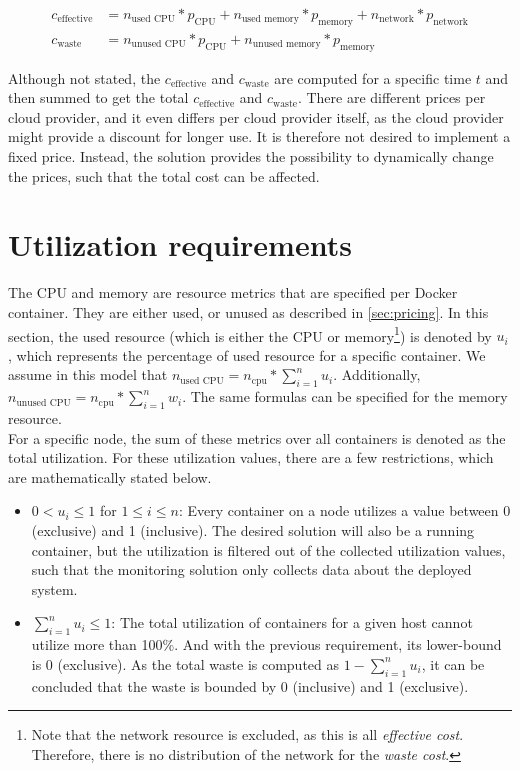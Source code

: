 \begin{equation} \label{eq:cost_and_waste}
\begin{split}
c_\text{effective} &=  n_\text{used CPU} * p_\text{CPU} + n_\text{used memory} * p_\text{memory} + n_\text{network} * p_\text{network} \\
c_\text{waste} &=  n_\text{unused CPU} * p_\text{CPU} + n_\text{unused memory} * p_\text{memory}
\end{split}
\end{equation}

\noindent 
Although not stated, the $c_\text{effective}$ and $c_\text{waste}$ are computed for a specific time $t$ and then summed to get the total $c_\text{effective}$ and $c_\text{waste}$. There are different prices per cloud provider, and it even differs per cloud provider itself, as the cloud provider might provide a discount for longer use. It is therefore not desired to implement a fixed price. Instead, the solution provides the possibility to dynamically change the prices, such that the total cost can be affected.

\section{Utilization requirements} \label{sec:util_req}
The CPU and memory are resource metrics that are specified per Docker container. They are either used, or unused as described in \autoref{sec:pricing}. In this section, the used resource (which is either the CPU or memory\footnote{Note that the network resource is excluded, as this is all \textit{effective cost}. Therefore, there is no distribution of the network for the \textit{waste cost}.}) is denoted by $u_i$, which represents the percentage of used resource for a specific container. We assume in this model that $n_\text{used CPU} = n_\text{cpu} * \sum_{i=1}^n u_i$. Additionally, $n_\text{unused CPU} = n_\text{cpu} * \sum_{i=1}^n w_i$. The same formulas can be specified for the memory resource.\\

\noindent
For a specific node, the sum of these metrics over all containers is denoted as the total utilization. For these utilization values, there are a few restrictions, which are mathematically stated below.

\begin{itemize}
    \item $0 < u_i \leq 1$ for $1 \leq i \leq n$: Every container on a node utilizes a value between $0$ (exclusive) and 1 (inclusive). The desired solution will also be a running container, but the utilization is filtered out of the collected utilization values, such that the monitoring solution only collects data about the deployed system.
    \item $\sum_{i=1}^n u_i \leq 1$: The total utilization of containers for a given host cannot utilize more than 100\%. And with the previous requirement, its lower-bound is 0 (exclusive). As the total waste is computed as $1 - \sum_{i=1}^n u_i$, it can be concluded that the waste is bounded by 0 (inclusive) and 1 (exclusive).
\end{itemize}



